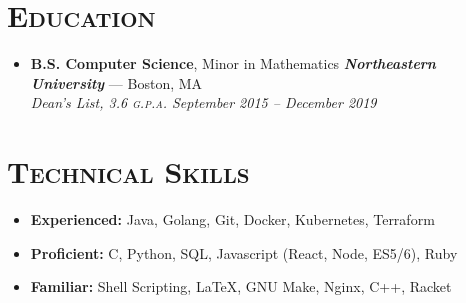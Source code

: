 \documentclass{article}
\begin{document}
\section*{\textsc{Education}}
\begin{itemize}[label={},leftmargin=*]
  \item \textbf{B.S. Computer Science}, Minor in Mathematics \hfill \textit{\textbf{Northeastern University}} --- Boston, MA \\
  \em{Dean's List}, 3.6 \textsc{g.p.a.}  \hfill \em{\textit{September 2015 -- December 2019}}
\end{itemize}

\section*{\textsc{Technical Skills}}
\begin{itemize}[label={},leftmargin=*]
  \item \textbf{Experienced:} Java, Golang, Git, Docker, Kubernetes, Terraform
  \item \textbf{Proficient:} C, Python, SQL, Javascript (React, Node, ES5/6), Ruby
  \item \textbf{Familiar:} Shell Scripting, LaTeX, GNU Make, Nginx, C++, Racket
\end{itemize}
\end{document}
